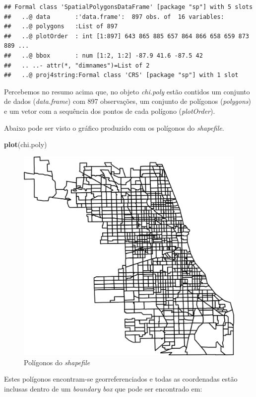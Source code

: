 \documentclass[12pt,]{article}
\newenvironment{Shaded}{\begin{snugshade}}{\end{snugshade}}
\newcommand{\KeywordTok}[1]{\textcolor[rgb]{0.13,0.29,0.53}{\textbf{{#1}}}}
\newcommand{\NormalTok}[1]{{#1}}
\begin{document}
\begin{verbatim}
## Formal class 'SpatialPolygonsDataFrame' [package "sp"] with 5 slots
##   ..@ data       :'data.frame':  897 obs. of  16 variables:
##   ..@ polygons   :List of 897
##   ..@ plotOrder  : int [1:897] 643 865 885 657 864 866 658 659 873 889 ...
##   ..@ bbox       : num [1:2, 1:2] -87.9 41.6 -87.5 42
##   .. ..- attr(*, "dimnames")=List of 2
##   ..@ proj4string:Formal class 'CRS' [package "sp"] with 1 slot
\end{verbatim}

Percebemos no resumo acima que, no objeto \emph{chi.poly} estão contidos
um conjunto de dados (\emph{data.frame}) com 897 observações, um
conjunto de polígonos (\emph{polygons}) e um vetor com a sequência dos
pontos de cada polígono (\emph{plotOrder}).

Abaixo pode ser visto o gráfico produzido com os polígonos do
\emph{shapefile}.

\begin{Shaded}
\begin{Highlighting}[]
\KeywordTok{plot}\NormalTok{(chi.poly)}
\end{Highlighting}
\end{Shaded}

\begin{figure}[H]

{\centering \includegraphics[width=.65\linewidth]{sfiles/plot-1} 

}

\caption{Polígonos do \textit{shapefile}}\label{fig:plot}
\end{figure}

Estes polígonos encontram-se georreferenciados e todas as coordenadas
estão inclusas dentro de um \emph{boundary box} que pode ser encontrado
em:
\end{document}
